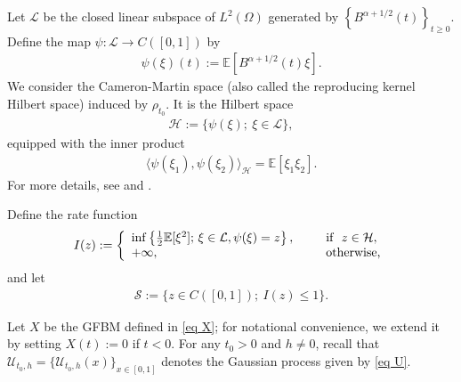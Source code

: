 \documentclass[11pt, reqno]{amsart}
\numberwithin{equation}{section}
\newcommand{\1}{{\bf 1}}
\newcommand{\2}{{\bf 2}}
\begin{document}
   Let $\mathcal L$ be the closed linear subspace of $L^2(\Omega)$  generated by  {$\left\{B^{\alpha+1/2}(t)\right\}_{t \ge 0}$}. 
   Define the map  $\psi:\mathcal L\rightarrow C([0,1])$ by
      \begin{align*}%
      \psi(\xi)(t):=\mathbb E\left[B^{\alpha+1/2}(t)\xi \right].
      \end{align*}
      We consider the  Cameron-Martin space (also called the reproducing kernel Hilbert space)   induced by    $\rho_{t_0} $. It is the Hilbert space  
\begin{align}\label{eq RKHS}
   \mathcal H:=\{\psi(\xi);\ \xi\in \mathcal L\},
    \end{align}
   equipped  with the inner product 
 \begin{align}\label{eq RKHS inn}
 \langle \psi(\xi_1), \psi(\xi_2)\rangle_{\mathcal H} =\mathbb E\left[\xi_1\xi_2 \right].  
 \end{align}
   For more details, see \cite{Arc, Aro1950, DU99} and \cite[Chapter 6.1]{BHOZ}.  
   
 Define the rate function
      \begin{equation}\label{eq rate}
   I(z):= \left\{\begin{array}{ll}
 \inf\left\{\frac12 \mathbb E[\xi^2]; \, \xi\in \mathcal L, \psi(\xi)=z\right\}, \ \quad &\hbox{ if }\  z\in \mathcal H,\\
 +\infty,  \ \quad &\hbox{ otherwise,}
\end{array}
\right.
 \end{equation}
and  let  
 \begin{align}\label{eq unit ball}
 \mathcal S:=\big\{z\in C([0,1]);\ I(z)\le 1\big\}.
 \end{align}

  Let $X$ be the GFBM defined in  \eqref{eq X};  for notational convenience,  we extend it by setting $X(t):=0$ if $t<0$.
  For any $t_0>0$ and $h\neq 0$,  recall that $ \mathcal U_{t_0, h}= \{\mathcal U_{t_0, h}(x)\}_{x\in [0,1]}$ denotes  the Gaussian process given  by \eqref{eq U}.
    
\end{document}
